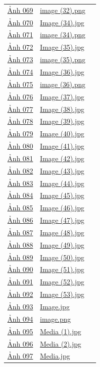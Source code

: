 \begin{longtable}{p{}p{}p{}}
\hyperref[src:069]{Ảnh 069} & \url{image (32).png} & \pageref{src:069}\\
\hyperref[src:070]{Ảnh 070} & \url{Image (34).jpg} & \pageref{src:070}\\
\hyperref[src:071]{Ảnh 071} & \url{image (34).png} & \pageref{src:071}\\
\hyperref[src:072]{Ảnh 072} & \url{Image (35).jpg} & \pageref{src:072}\\
\hyperref[src:073]{Ảnh 073} & \url{image (35).png} & \pageref{src:073}\\
\hyperref[src:074]{Ảnh 074} & \url{Image (36).jpg} & \pageref{src:074}\\
\hyperref[src:075]{Ảnh 075} & \url{image (36).png} & \pageref{src:075}\\
\hyperref[src:076]{Ảnh 076} & \url{Image (37).jpg} & \pageref{src:076}\\
\hyperref[src:077]{Ảnh 077} & \url{Image (38).jpg} & \pageref{src:077}\\
\hyperref[src:078]{Ảnh 078} & \url{Image (39).jpg} & \pageref{src:078}\\
\hyperref[src:079]{Ảnh 079} & \url{Image (40).jpg} & \pageref{src:079}\\
\hyperref[src:080]{Ảnh 080} & \url{Image (41).jpg} & \pageref{src:080}\\
\hyperref[src:081]{Ảnh 081} & \url{Image (42).jpg} & \pageref{src:081}\\
\hyperref[src:082]{Ảnh 082} & \url{Image (43).jpg} & \pageref{src:082}\\
\hyperref[src:083]{Ảnh 083} & \url{Image (44).jpg} & \pageref{src:083}\\
\hyperref[src:084]{Ảnh 084} & \url{Image (45).jpg} & \pageref{src:084}\\
\hyperref[src:085]{Ảnh 085} & \url{Image (46).jpg} & \pageref{src:085}\\
\hyperref[src:086]{Ảnh 086} & \url{Image (47).jpg} & \pageref{src:086}\\
\hyperref[src:087]{Ảnh 087} & \url{Image (48).jpg} & \pageref{src:087}\\
\hyperref[src:088]{Ảnh 088} & \url{Image (49).jpg} & \pageref{src:088}\\
\hyperref[src:089]{Ảnh 089} & \url{Image (50).jpg} & \pageref{src:089}\\
\hyperref[src:090]{Ảnh 090} & \url{Image (51).jpg} & \pageref{src:090}\\
\hyperref[src:091]{Ảnh 091} & \url{Image (52).jpg} & \pageref{src:091}\\
\hyperref[src:092]{Ảnh 092} & \url{Image (53).jpg} & \pageref{src:092}\\
\hyperref[src:093]{Ảnh 093} & \url{Image.jpg} & \pageref{src:093}\\
\hyperref[src:094]{Ảnh 094} & \url{image.png} & \pageref{src:094}\\
\hyperref[src:095]{Ảnh 095} & \url{Media (1).jpg} & \pageref{src:095}\\
\hyperref[src:096]{Ảnh 096} & \url{Media (2).jpg} & \pageref{src:096}\\
\hyperref[src:097]{Ảnh 097} & \url{Media.jpg} & \pageref{src:097}\\
\bottomrule
\end{longtable}
